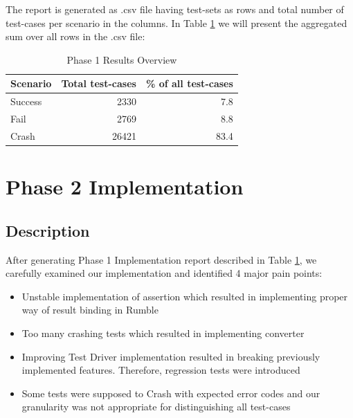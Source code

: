 The report is generated as .csv file having test-sets as rows and total number of test-cases per scenario in the columns. In Table \ref{tab:Phase1_ResultTable} we will present the aggregated sum over all rows in the .csv file:
\begin{table}[h!]
	\centering
	\begin{tabular}{|l|r|r|}
		\hline
		\multicolumn{1}{|c|}{Scenario} & \multicolumn{1}{c|}{Total test-cases} & \multicolumn{1}{c|}{\% of all test-cases} \\ \hline
		Success                        & 2330                                  & 7.8                                       \\ \hline
		Fail                           & 2769                                  & 8.8                                       \\ \hline
		Crash                          & 26421                                 & 83.4                                      \\ \hline
	\end{tabular}
 	\caption{Phase 1 Results Overview}
 	\label{tab:Phase1_ResultTable}
\end{table}

\section{Phase 2 Implementation}
\subsection{Description}
\label{Phase2_Description}
After generating Phase 1 Implementation report described in Table \ref{tab:Phase1_ResultTable}, we carefully examined our implementation and identified 4 major pain points:
\begin{itemize}
	\item Unstable implementation of assertion which resulted in implementing proper way of result binding in Rumble
	\item Too many crashing tests which resulted in implementing converter
	\item Improving Test Driver implementation resulted in breaking previously implemented features. Therefore, regression tests were introduced
	\item Some tests were supposed to Crash with expected error codes and our granularity was not appropriate for distinguishing all test-cases
\end{itemize}


